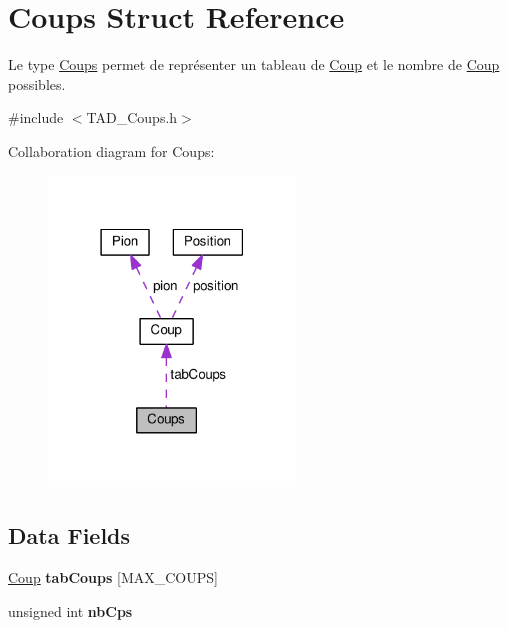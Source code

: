 \hypertarget{struct_coups}{}\section{Coups Struct Reference}
\label{struct_coups}


Le type \hyperlink{struct_coups}{Coups} permet de représenter un tableau de \hyperlink{struct_coup}{Coup} et le nombre de \hyperlink{struct_coup}{Coup} possibles.  




{\ttfamily \#include $<$T\+A\+D\+\_\+\+Coups.\+h$>$}



Collaboration diagram for Coups\+:
\nopagebreak
\begin{figure}[H]
\begin{center}
\leavevmode
\includegraphics[width=186pt]{struct_coups__coll__graph}
\end{center}
\end{figure}
\subsection*{Data Fields}
\begin{DoxyCompactItemize}
\item 
\hypertarget{struct_coups_a7cea13a13332e303305612eb96861901}{}\hyperlink{struct_coup}{Coup} {\bfseries tab\+Coups} \mbox{[}M\+A\+X\+\_\+\+C\+O\+U\+P\+S\mbox{]}\label{struct_coups_a7cea13a13332e303305612eb96861901}

\item 
\hypertarget{struct_coups_a7e148eb1c2c883deb916170376c93d3c}{}unsigned int {\bfseries nb\+Cps}\label{struct_coups_a7e148eb1c2c883deb916170376c93d3c}

\end{DoxyCompactItemize}


